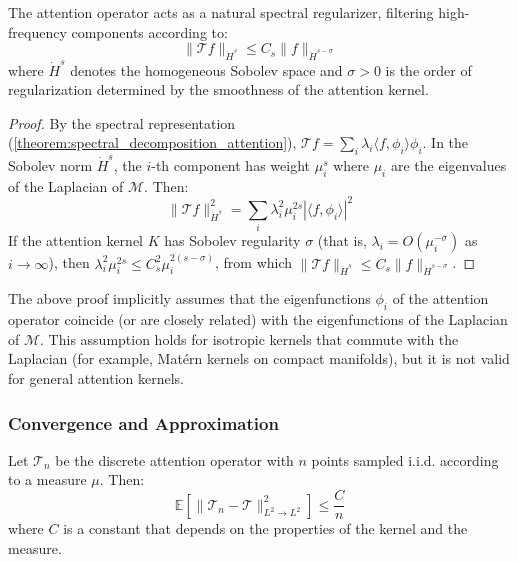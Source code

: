 \begin{theorem}\label{theorem:spectral_regularization}
    The attention operator acts as a natural spectral regularizer, filtering high-frequency components according to:
    \begin{equation}
        \|\mathcal{T}f\|_{\dot{H}^s} \leq C_s \|f\|_{\dot{H}^{s-\sigma}}
        \label{eq:spectral_regularization}
    \end{equation}
    where $\dot{H}^s$ denotes the homogeneous Sobolev space and $\sigma > 0$ is the order of regularization determined by the smoothness of the attention kernel.
\end{theorem}

\begin{proof}
By the spectral representation (\autoref{theorem:spectral_decomposition_attention}), $\mathcal{T}f = \sum_i \lambda_i \langle f, \phi_i\rangle \phi_i$. In the Sobolev norm $\dot{H}^s$, the $i$-th component has weight $\mu_i^s$ where $\mu_i$ are the eigenvalues of the Laplacian of $\mathcal{M}$. Then:
\[
\|\mathcal{T}f\|_{\dot{H}^s}^2 = \sum_i \lambda_i^2 \mu_i^{2s} |\langle f, \phi_i\rangle|^2
\]
If the attention kernel $K$ has Sobolev regularity $\sigma$ (that is, $\lambda_i = O(\mu_i^{-\sigma})$ as $i \to \infty$), then $\lambda_i^2 \mu_i^{2s} \leq C_s^2 \mu_i^{2(s-\sigma)}$, from which $\|\mathcal{T}f\|_{\dot{H}^s} \leq C_s \|f\|_{\dot{H}^{s-\sigma}}$.
\end{proof}

\begin{remark}
The above proof implicitly assumes that the eigenfunctions $\phi_i$ of the attention operator coincide (or are closely related) with the eigenfunctions of the Laplacian of $\mathcal{M}$. This assumption holds for isotropic kernels that commute with the Laplacian (for example, Matérn kernels on compact manifolds), but it is not valid for general attention kernels.
\end{remark}

\subsubsection{Convergence and Approximation}

\begin{theorem}\label{theorem:monte_carlo_convergence}
    Let $\mathcal{T}_n$ be the discrete attention operator with $n$ points sampled i.i.d. according to a measure $\mu$. Then:
    \begin{equation}
        \mathbb{E}[\|\mathcal{T}_n - \mathcal{T}\|_{L^2 \to L^2}^2] \leq \frac{C}{n}
        \label{eq:monte_carlo_rate}
    \end{equation}
    where $C$ is a constant that depends on the properties of the kernel and the measure.
\end{theorem}

